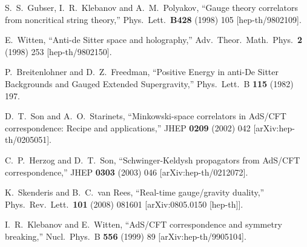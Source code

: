 \begin{thebibliography}{99}

%
%
 
  S.~S.~Gubser, I.~R.~Klebanov and A.~M.~Polyakov,
  ``Gauge theory correlators from noncritical string theory,''
  Phys.\ Lett.\  {\bf B428 } (1998)  105
  [hep-th/9802109].
  
  E.~Witten,
  ``Anti-de Sitter space and holography,''
  Adv.\ Theor.\ Math.\ Phys.\  {\bf 2 } (1998)  253
  [hep-th/9802150].
  
  P.~Breitenlohner and D.~Z.~Freedman,
  ``Positive Energy in anti-De Sitter Backgrounds and Gauged Extended Supergravity,''
  Phys.\ Lett.\ B {\bf 115} (1982) 197.
  

  
  D.~T.~Son and A.~O.~Starinets,
  ``Minkowski-space correlators in AdS/CFT correspondence: Recipe and
  applications,''
  JHEP {\bf 0209} (2002) 042
  [arXiv:hep-th/0205051].
  
  C.~P.~Herzog and D.~T.~Son,
  ``Schwinger-Keldysh propagators from AdS/CFT correspondence,''
  JHEP {\bf 0303} (2003) 046
  [arXiv:hep-th/0212072].

  K.~Skenderis and B.~C.~van Rees,
  ``Real-time gauge/gravity duality,''
  Phys.\ Rev.\ Lett.\  {\bf 101} (2008) 081601
  [arXiv:0805.0150 [hep-th]].

  I.~R.~Klebanov and E.~Witten,
  ``AdS/CFT correspondence and symmetry breaking,''
  Nucl.\ Phys.\  B {\bf 556} (1999) 89
  [arXiv:hep-th/9905104].

\end{thebibliography}